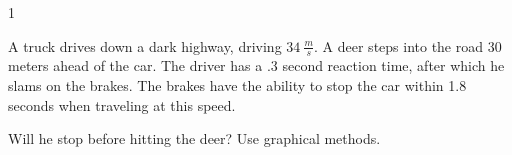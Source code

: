 
\AddToShipoutPicture*{\BackgroundPic}

\addtocounter {ProbNum} {1}

 
{\bf \Large{}} A truck drives down a dark highway, driving ${34~\tfrac{m}{s}}$.  A deer steps into the road 30 meters ahead of the car.  The driver has a .3 second reaction time, after which he slams on the brakes.  The brakes have the ability to stop the car within 1.8 seconds when traveling at this speed.  \bigskip

Will he stop before hitting the deer?  Use graphical methods.
\paragraph{}
\noindent
\vfill





\newpage
